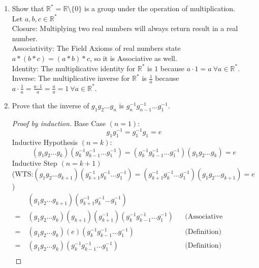\documentclass[12pt]{article}
\newcommand\setitemnumber[1]{\setcounter{enumi}{\numexpr#1-1\relax}}
\begin{document}
\begin{enumerate}[label=\textbf{\arabic*}.]
\begin{enumerate}
	      \end{enumerate}
	      \setitemnumber{13}
	\item Show that \(\mathbb{R}^* = \mathbb{R}\setminus \{0\} \) is a group under the operation of multiplication. \\
	      Let $a,b,c \in \mathbb{R}^*$ \\
	      Closure: Multiplying two real numbers will always return result in a real number. \\
	      Associativity: The Field Axioms of real numbers state \(a*(b*c) = (a*b)*c\), so it is Associative as well. \\
	      Identity: The multiplicative identity for $\mathbb{R}^*$ is $1$ because \(a \cdot 1=a \ \forall a \in \mathbb{R}^*\). \\
	      Inverse: The multiplicative inverse for $\mathbb{R}^*$ is $\frac{1}{a}$ because
	      \(a \cdot \frac{1}{a} = \frac{a \cdot 1}{a} = \frac{a}{a} = 1 \ \forall a \in \mathbb{R}^*\).
	      \pagebreak
	      \setitemnumber{27}
	\item Prove that the inverse of \(g_{1}g_{2} \dots g_{n}\) is \(g_{n}^{-1}g_{n-1}^{-1} \dots g_{1}^{-1}\).
	      \begin{proof}[Proof by induction]
		      Base Case $(n = 1)$:
		      \[g_{1}g_{1}^{-1} = g_{1}^{-1}g_{1} = e\]
		      Inductive Hypothesis $(n = k)$:
		      \[(g_{1}g_{2} \dots g_{k})(g_{k}^{-1}g_{k-1}^{-1} \dots g_{1}^{-1}) = (g_{k}^{-1}g_{k-1}^{-1} \dots g_{1}^{-1})(g_{1}g_{2} \dots g_{k}) = e \]
		      Inductive Step $(n = k + 1)$ \\
		      (WTS:\@ \((g_{1}g_{2} \dots g_{k+1})(g_{k+1}^{-1}g_{k}^{-1} \dots g_{1}^{-1}) = (g_{k+1}^{-1}g_{k}^{-1} \dots g_{1}^{-1})(g_{1}g_{2} \dots g_{k+1})  = e \))
		      \begin{align*}
			        & \ (g_{1}g_{2} \dots g_{k + 1})(g_{k+1}^{-1}g_{k}^{-1} \dots g_{1}^{-1})                                                             \\
			      = & \ (g_{1}g_{2} \dots g_{k})(g_{k + 1})(g_{k+1}^{-1})(g_{k}^{-1}g_{k-1}^{-1} \dots g_{1}^{-1})     &  & \text{(Associative Property)} \\
			      = & \ (g_{1}g_{2} \dots g_{k})(e)(g_{k}^{-1}g_{k-1}^{-1} \dots g_{1}^{-1})                           &  & \text{(Definition)}           \\
			      = & \ (g_{1}g_{2} \dots g_{k})(g_{k}^{-1}g_{k-1}^{-1} \dots g_{1}^{-1})                              &  & \text{(Definition)}           \\

\end{align*}
\end{proof}
\end{enumerate}
\end{document}
